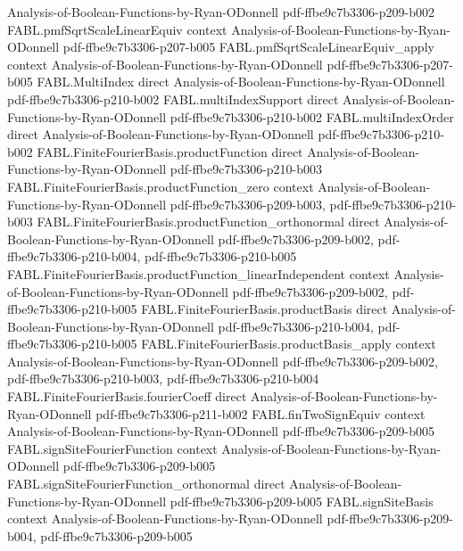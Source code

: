 \begin{theorem}
  {Analysis-of-Boolean-Functions-by-Ryan-ODonnell}
  {pdf-ffbe9c7b3306-p209-b002}
\proofstep
  {FABL.pmfSqrtScaleLinearEquiv}
  {context}
  {Analysis-of-Boolean-Functions-by-Ryan-ODonnell}
  {pdf-ffbe9c7b3306-p207-b005}
\proofstep
  {FABL.pmfSqrtScaleLinearEquiv_apply}
  {context}
  {Analysis-of-Boolean-Functions-by-Ryan-ODonnell}
  {pdf-ffbe9c7b3306-p207-b005}
\proofstep
  {FABL.MultiIndex}
  {direct}
  {Analysis-of-Boolean-Functions-by-Ryan-ODonnell}
  {pdf-ffbe9c7b3306-p210-b002}
\proofstep
  {FABL.multiIndexSupport}
  {direct}
  {Analysis-of-Boolean-Functions-by-Ryan-ODonnell}
  {pdf-ffbe9c7b3306-p210-b002}
\proofstep
  {FABL.multiIndexOrder}
  {direct}
  {Analysis-of-Boolean-Functions-by-Ryan-ODonnell}
  {pdf-ffbe9c7b3306-p210-b002}
\proofstep
  {FABL.FiniteFourierBasis.productFunction}
  {direct}
  {Analysis-of-Boolean-Functions-by-Ryan-ODonnell}
  {pdf-ffbe9c7b3306-p210-b003}
\proofstep
  {FABL.FiniteFourierBasis.productFunction_zero}
  {context}
  {Analysis-of-Boolean-Functions-by-Ryan-ODonnell}
  {pdf-ffbe9c7b3306-p209-b003,
    pdf-ffbe9c7b3306-p210-b003}
\proofstep
  {FABL.FiniteFourierBasis.productFunction_orthonormal}
  {direct}
  {Analysis-of-Boolean-Functions-by-Ryan-ODonnell}
  {pdf-ffbe9c7b3306-p209-b002,
    pdf-ffbe9c7b3306-p210-b004,
    pdf-ffbe9c7b3306-p210-b005}
\proofstep
  {FABL.FiniteFourierBasis.productFunction_linearIndependent}
  {context}
  {Analysis-of-Boolean-Functions-by-Ryan-ODonnell}
  {pdf-ffbe9c7b3306-p209-b002,
    pdf-ffbe9c7b3306-p210-b005}
\proofstep
  {FABL.FiniteFourierBasis.productBasis}
  {direct}
  {Analysis-of-Boolean-Functions-by-Ryan-ODonnell}
  {pdf-ffbe9c7b3306-p210-b004,
    pdf-ffbe9c7b3306-p210-b005}
\proofstep
  {FABL.FiniteFourierBasis.productBasis_apply}
  {context}
  {Analysis-of-Boolean-Functions-by-Ryan-ODonnell}
  {pdf-ffbe9c7b3306-p209-b002,
    pdf-ffbe9c7b3306-p210-b003,
    pdf-ffbe9c7b3306-p210-b004}
\proofstep
  {FABL.FiniteFourierBasis.fourierCoeff}
  {direct}
  {Analysis-of-Boolean-Functions-by-Ryan-ODonnell}
  {pdf-ffbe9c7b3306-p211-b002}
\proofstep
  {FABL.finTwoSignEquiv}
  {context}
  {Analysis-of-Boolean-Functions-by-Ryan-ODonnell}
  {pdf-ffbe9c7b3306-p209-b005}
\proofstep
  {FABL.signSiteFourierFunction}
  {context}
  {Analysis-of-Boolean-Functions-by-Ryan-ODonnell}
  {pdf-ffbe9c7b3306-p209-b005}
\proofstep
  {FABL.signSiteFourierFunction_orthonormal}
  {direct}
  {Analysis-of-Boolean-Functions-by-Ryan-ODonnell}
  {pdf-ffbe9c7b3306-p209-b005}
\proofstep
  {FABL.signSiteBasis}
  {context}
  {Analysis-of-Boolean-Functions-by-Ryan-ODonnell}
  {pdf-ffbe9c7b3306-p209-b004,
    pdf-ffbe9c7b3306-p209-b005}

\end{theorem}

